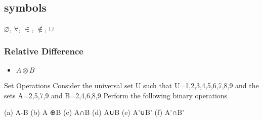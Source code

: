 \subsection*{symbols}
$\varnothing$,
$\forall$,
$\in$,
$\notin$,
$\cup$


\newpage



\subsubsection*{Relative Difference}
\begin{itemize}
\item $ A \otimes B$
\end{itemize}

Set Operations
Consider the universal set U such that U={1,2,3,4,5,6,7,8,9}  and the sets A={2,5,7,9}  and  B={2,4,6,8,9} 
Perform the following binary operations

(a) A-B
(b) A ⊕B
(c) A∩B
(d) A∪B
(e) A'∪B'
(f) A'∩B'
